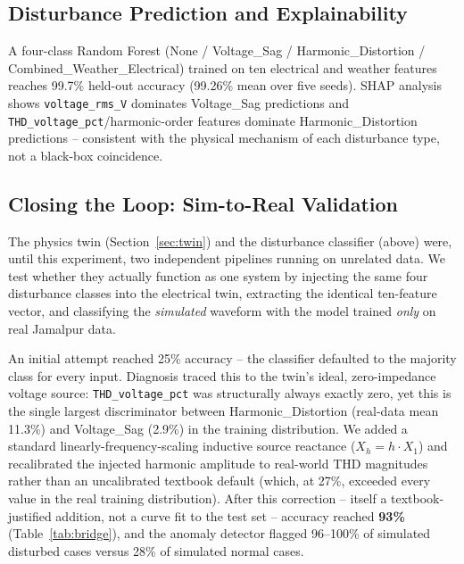\documentclass[conference]{IEEEtran}
\begin{document}
\subsection{Disturbance Prediction and Explainability}
A four-class Random Forest (None / Voltage\_Sag /
Harmonic\_Distortion / Combined\_Weather\_Electrical) trained on ten
electrical and weather features reaches 99.7\% held-out accuracy
(99.26\% mean over five seeds). SHAP analysis shows
\texttt{voltage\_rms\_V} dominates Voltage\_Sag predictions and
\texttt{THD\_voltage\_pct}/harmonic-order features dominate
Harmonic\_Distortion predictions -- consistent with the physical
mechanism of each disturbance type, not a black-box coincidence.

\subsection{Closing the Loop: Sim-to-Real Validation}
\label{sec:bridge}
The physics twin (Section~\ref{sec:twin}) and the disturbance
classifier (above) were, until this experiment, two independent
pipelines running on unrelated data. We test whether they actually
function as one system by injecting the same four disturbance
classes into the electrical twin, extracting the identical
ten-feature vector, and classifying the \emph{simulated} waveform
with the model trained \emph{only} on real Jamalpur data.

An initial attempt reached 25\% accuracy -- the classifier defaulted
to the majority class for every input. Diagnosis traced this to the
twin's ideal, zero-impedance voltage source: \texttt{THD\_voltage\_pct}
was structurally always exactly zero, yet this is the single largest
discriminator between Harmonic\_Distortion (real-data mean 11.3\%)
and Voltage\_Sag (2.9\%) in the training distribution. We added a
standard linearly-frequency-scaling inductive source reactance
($X_h = h \cdot X_1$) and recalibrated the injected harmonic
amplitude to real-world THD magnitudes rather than an uncalibrated
textbook default (which, at 27\%, exceeded every value in the real
training distribution). After this correction -- itself a
textbook-justified addition, not a curve fit to the test set --
accuracy reached \textbf{93\%} (Table~\ref{tab:bridge}), and the
anomaly detector flagged 96--100\% of simulated disturbed cases
versus 28\% of simulated normal cases.
\end{document}
